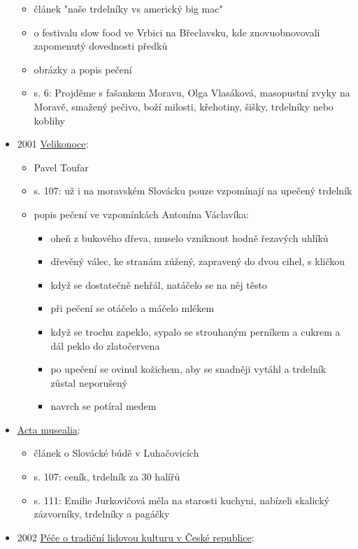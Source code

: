\begin{itemize}
  \begin{itemize}
  \tightlist
  \item
    článek "naše trdelníky vs americký big mac"
  \item
    o festivalu slow food ve Vrbici na Břeclavsku, kde znovuobnovovali
    zapomenutý dovednosti předků
  \item
    obrázky a popis pečení
  \item
    s. 6: Projděme s fašankem Moravu, Olga Vlasáková, masopustní zvyky
    na Moravě, smažený pečivo, boží milosti, křehotiny, šišky, trdelníky
    nebo koblihy
  \end{itemize}
\item
  2001
  \href{https://ceskadigitalniknihovna.cz/uuid/uuid:34c2b160-28d1-11e7-9efd-005056827e52}{Velikonoce}:

  \begin{itemize}
  \tightlist
  \item
    Pavel Toufar
  \item
    s. 107: už i na moravském Slovácku pouze vzpomínají na upečený
    trdelník
  \item
    popis pečení ve vzpomínkách Antonína Václavíka:

    \begin{itemize}
    \tightlist
    \item
      oheň z bukového dřeva, muselo vzniknout hodně řezavých uhlíků
    \item
      dřevěný válec, ke stranám zúžený, zapravený do dvou cihel, s
      kličkou
    \item
      když se dostatečně nehřál, natáčelo se na něj těsto
    \item
      při pečení se otáčelo a máčelo mlékem
    \item
      když se trochu zapeklo, sypalo se strouhaným perníkem a cukrem a
      dál peklo do zlatočervena
    \item
      po upečení se ovinul kožichem, aby se snadněji vytáhl a trdelník
      zůstal neporušený
    \item
      navrch se potíral medem
    \end{itemize}
  \end{itemize}
\item
  \href{https://ceskadigitalniknihovna.cz/uuid/uuid:06cd95f1-915c-4408-8ab5-5e8abdacd4ea}{Acta
  musealia}:

  \begin{itemize}
  \tightlist
  \item
    článek o Slovácké búdě v Luhačovicích
  \item
    s. 107: ceník, trdelník za 30 halířů
  \item
    s. 111: Emilie Jurkovičová měla na starosti kuchyni, nabízeli
    skalický zázvorníky, trdelníky a pagáčky
  \end{itemize}
\item
  2002
  \href{https://www.digitalniknihovna.cz/nulk/uuid/uuid:f582cd95-65fe-4d23-b7a5-29f879aeeab3}{Péče
  o tradiční lidovou kulturu v České republice}:


\end{itemize}
